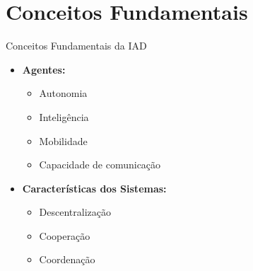 \documentclass[aspectratio=169,xcolor=table]{beamer}
\begin{document}
\section{Conceitos Fundamentais}
\begin{frame}{Conceitos Fundamentais da IAD}
    \begin{itemize}
        \item \textbf{Agentes:}
        \begin{itemize}
            \item Autonomia
            \item Inteligência
            \item Mobilidade
            \item Capacidade de comunicação
        \end{itemize}
        \item \textbf{Características dos Sistemas:}
        \begin{itemize}
            \item Descentralização
            \item Cooperação
            \item Coordenação
        \end{itemize}
    \end{itemize}
\end{frame}

\end{document}
